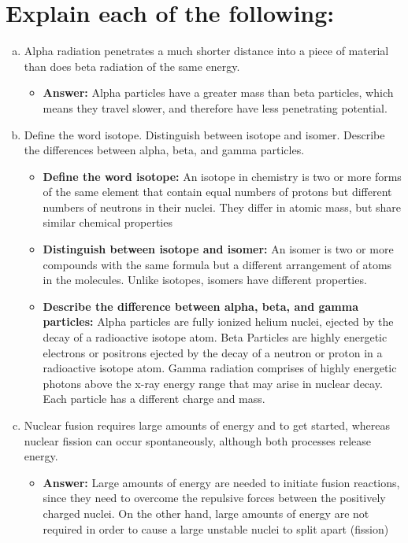 \documentclass{scrartcl}
\begin{document}
\section{Explain each of the following:}
\label{sec:org5a1a779}
\begin{enumerate}[(a)]
\item Alpha radiation penetrates a much shorter distance into a piece of
material than does beta radiation of the same energy.
\begin{itemize}
\item \textbf{Answer:} Alpha particles have a greater mass than beta particles, which means they travel slower, and therefore have less penetrating potential.
\end{itemize}

\item Define the word isotope. Distinguish between isotope and isomer. Describe
the differences between alpha, beta, and gamma particles.
\begin{itemize}
\item \textbf{Define the word isotope:} An isotope in chemistry is two or more forms of the same element that
contain equal numbers of protons but different numbers of neutrons in
their nuclei. They differ in atomic mass, but share similar chemical properties
\item \textbf{Distinguish between isotope and isomer:} An isomer is two or more compounds with the same formula but a different arrangement of atoms in the molecules. Unlike isotopes, isomers have different properties.
\item \textbf{Describe the difference between alpha, beta, and gamma particles:}
Alpha particles are fully ionized helium nuclei, ejected by the decay
of a radioactive isotope atom. Beta Particles are highly energetic
electrons or positrons ejected by the decay of a neutron or proton in
a radioactive isotope atom. Gamma radiation comprises of highly
energetic photons above the x-ray energy range that may arise in nuclear decay. Each particle has a different charge and mass.
\end{itemize}

\item Nuclear fusion requires large amounts of energy and to get started,
whereas nuclear fission can occur spontaneously, although both processes
release energy.
\begin{itemize}
\item \textbf{Answer:} Large amounts of energy are needed to initiate fusion reactions, since
they need to overcome the repulsive forces between the positively
charged nuclei. On the other hand, large amounts of energy are not required in order to cause a large unstable nuclei to split apart (fission)
\end{itemize}


\end{enumerate}
\end{document}
